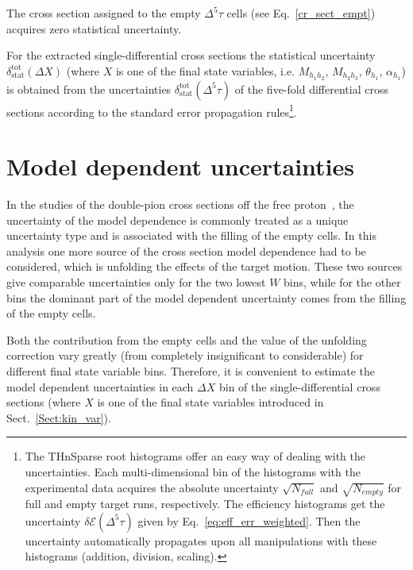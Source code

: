 The cross section assigned to the empty $\Delta^{5} \tau$ cells (see Eq.~\eqref{cr_sect_empt}) acquires zero statistical uncertainty.

For the extracted  single-differential cross sections the statistical uncertainty $\delta_{\text{stat}}^{\text{tot}}(\Delta X)$ (where $X$ is one of the final state variables, i.e. $M_{h_{1}h_{2}}$, $M_{h_{2}h_{3}}$, $\theta_{h_1}$, $\alpha_{h_1}$) is obtained from the uncertainties  $\delta_{\text{stat}}^{\text{tot}}(\Delta^{5} \tau)$ of the five-fold differential cross sections according to the standard error propagation rules\footnote[1]{The THnSparse root histograms offer an easy way of dealing with the uncertainties. Each multi-dimensional bin of the histograms with the experimental data acquires the absolute uncertainty $\sqrt{N_{full}}$ and $\sqrt{N_{empty}}$ for full and empty target runs, respectively. The efficiency histograms get the uncertainty $\delta \mathcal{E}(\Delta^{5} \tau)$ given by Eq.~\eqref{eq:eff_err_weighted}. Then the uncertainty automatically propagates upon all manipulations with these histograms (addition, division, scaling).}.




\section{Model dependent uncertainties}
\label{Sect:mod_dep}
In the studies of the double-pion cross sections off the free proton~\cite{Rip_an_note:2002,Ripani:2002ss,Fed_an_note:2007,Fedotov:2008aa,Isupov:2017lnd,Arjun,Fed_an_note:2017,Fed_paper_2018}, the uncertainty of the model dependence is commonly treated as a unique uncertainty type and is associated with the filling of the empty cells. In this analysis one more source of the cross section model dependence had to be considered, which is unfolding the effects of the target motion. These two sources give comparable uncertainties only for the two lowest $W$ bins, while for the other bins the dominant part of the model dependent uncertainty comes from the filling of the empty cells.

Both the contribution from the empty cells and the value of the unfolding correction vary greatly (from completely insignificant to considerable) for different final state variable bins. Therefore, it is convenient to estimate the model dependent uncertainties in each $\Delta X$ bin of the single-differential cross sections (where $X$ is one of the final state variables introduced in Sect.~\ref{Sect:kin_var}).


